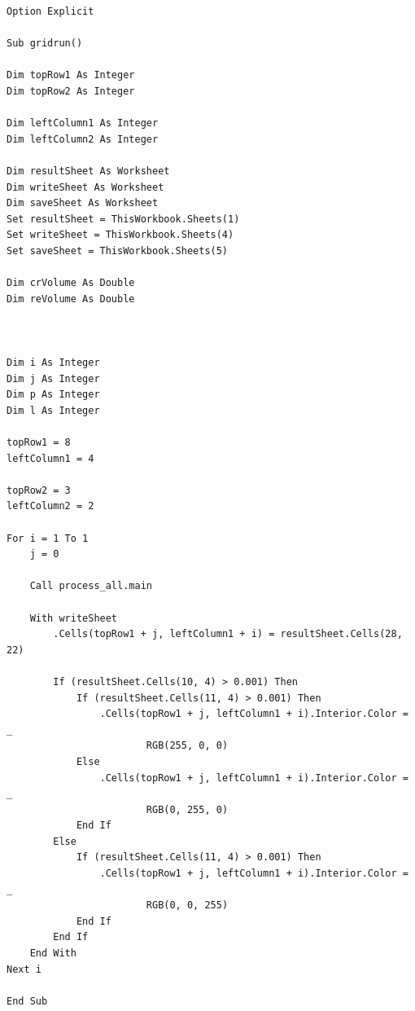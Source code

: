 \documentclass[a4j]{jsreport}
\begin{document}
\begin{lstlisting}[caption=最適化を行うコード]
Option Explicit

Sub gridrun()

Dim topRow1 As Integer
Dim topRow2 As Integer

Dim leftColumn1 As Integer
Dim leftColumn2 As Integer

Dim resultSheet As Worksheet
Dim writeSheet As Worksheet
Dim saveSheet As Worksheet
Set resultSheet = ThisWorkbook.Sheets(1)
Set writeSheet = ThisWorkbook.Sheets(4)
Set saveSheet = ThisWorkbook.Sheets(5)

Dim crVolume As Double
Dim reVolume As Double



Dim i As Integer
Dim j As Integer
Dim p As Integer
Dim l As Integer

topRow1 = 8
leftColumn1 = 4

topRow2 = 3
leftColumn2 = 2

For i = 1 To 1
    j = 0

    Call process_all.main

    With writeSheet
        .Cells(topRow1 + j, leftColumn1 + i) = resultSheet.Cells(28, 22)

        If (resultSheet.Cells(10, 4) > 0.001) Then
            If (resultSheet.Cells(11, 4) > 0.001) Then
                .Cells(topRow1 + j, leftColumn1 + i).Interior.Color = _
                        RGB(255, 0, 0)
            Else
                .Cells(topRow1 + j, leftColumn1 + i).Interior.Color = _
                        RGB(0, 255, 0)
            End If
        Else
            If (resultSheet.Cells(11, 4) > 0.001) Then
                .Cells(topRow1 + j, leftColumn1 + i).Interior.Color = _
                        RGB(0, 0, 255)
            End If
        End If
    End With
Next i

End Sub
\end{lstlisting}
\end{document}

